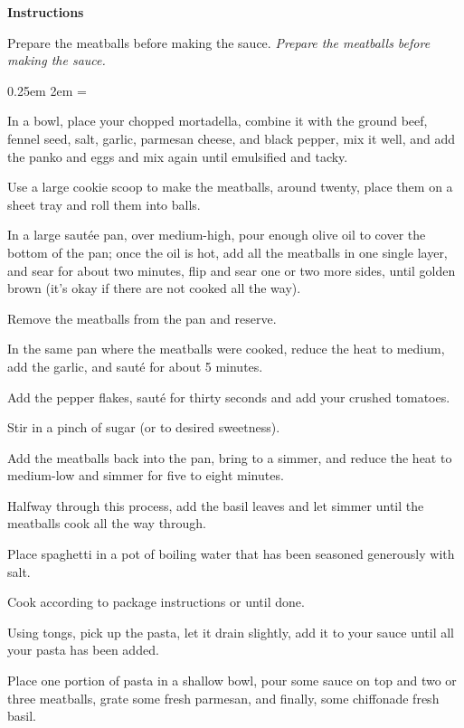 \documentclass{article}
\newcounter{stepnum}
\newenvironment{method}[1][]{
    \setcounter{stepnum}{0}
    \noindent
    {\color{red}\Large\textbf{Instructions}}
    \par
    \smallskip
    \if#1
    \else
        \noindent
        \emph{#1}
        \par
    \fi
    \begingroup
    \parindent0pt
    \parskip0.25em
        \leftskip2em
    \everypar={\llap{\ensuremath{\stepcounter{stepnum}\hbox to2em{\thestepnum.\hfill}}}}
}{%
    \par
    \endgroup
}
\begin{document}
\begin{method}[Prepare the meatballs before making the sauce.]
    In a bowl, place your chopped mortadella, combine it with the ground beef, fennel seed, salt, garlic, parmesan cheese, and black pepper, mix it well, and add the panko and eggs and mix again until emulsified and tacky.\par
    Use a large cookie scoop to make the meatballs, around twenty, place them on a sheet tray and roll them into balls.\par
    In a large saut\'ee pan, over medium-high, pour enough olive oil to cover the bottom of the pan; once the oil is hot, add all the meatballs in one single layer, and sear for about two minutes, flip and sear one or two more sides, until golden brown (it's okay if there are not cooked all the way).\par
    Remove the meatballs from the pan and reserve.\par

    In the same pan where the meatballs were cooked, reduce the heat to medium, add the garlic, and saut\'e for about 5 minutes.\par
    Add the pepper flakes, saut\'e for thirty seconds and add your crushed tomatoes.\par
    Stir in a pinch of sugar (or to desired sweetness).\par
    Add the meatballs back into the pan, bring to a simmer, and reduce the heat to medium-low and simmer for five to eight minutes.\par
    Halfway through this process, add the basil leaves and let simmer until the meatballs cook all the way through.\par

    Place spaghetti in a pot of boiling water that has been seasoned generously with salt.\par
    Cook according to package instructions or until done.\par
    Using tongs, pick up the pasta, let it drain slightly, add it to your sauce until all your pasta has been added.\par
    Place one portion of pasta in a shallow bowl, pour some sauce on top and two or three meatballs, grate some fresh parmesan, and finally, some chiffonade fresh basil.
\end{method}
\end{document}
